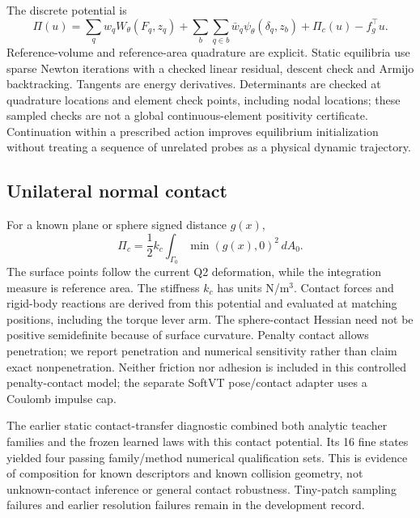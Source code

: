 \documentclass[10pt,twocolumn,letterpaper]{article}
\begin{document}
The discrete potential is
\begin{equation}
 \Pi(u)=\sum_q w_q W_\theta(F_q,z_q)+\sum_b\sum_{q\in b}\bar w_q\psi_\theta(\delta_q,z_b)+\Pi_c(u)-f_g^\top u.
\end{equation}
Reference-volume and reference-area quadrature are explicit. Static equilibria use sparse Newton iterations with a checked linear residual, descent check and Armijo backtracking. Tangents are energy derivatives. Determinants are checked at quadrature locations and element check points, including nodal locations; these sampled checks are not a global continuous-element positivity certificate. Continuation within a prescribed action improves equilibrium initialization without treating a sequence of unrelated probes as a physical dynamic trajectory.

\subsection{Unilateral normal contact}
For a known plane or sphere signed distance $g(x)$,
\begin{equation}
 \Pi_c=\frac12 k_c\int_{\Gamma_0}\min(g(x),0)^2\,dA_0.
\end{equation}
The surface points follow the current Q2 deformation, while the integration measure is reference area. The stiffness $k_c$ has units N/m$^3$. Contact forces and rigid-body reactions are derived from this potential and evaluated at matching positions, including the torque lever arm. The sphere-contact Hessian need not be positive semidefinite because of surface curvature. Penalty contact allows penetration; we report penetration and numerical sensitivity rather than claim exact nonpenetration. Neither friction nor adhesion is included in this controlled penalty-contact model; the separate SoftVT pose/contact adapter uses a Coulomb impulse cap.

The earlier static contact-transfer diagnostic combined both analytic teacher families and the frozen learned laws with this contact potential. Its 16 fine states yielded four passing family/method numerical qualification sets. This is evidence of composition for known descriptors and known collision geometry, not unknown-contact inference or general contact robustness. Tiny-patch sampling failures and earlier resolution failures remain in the development record.
\end{document}
